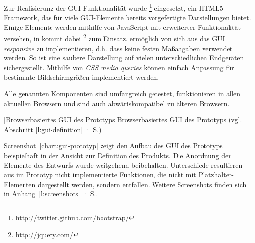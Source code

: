 Zur Realisierung der GUI-Funktionalität wurde \footnote{\url{http://twitter.github.com/bootstrap/}} eingesetzt, ein HTML5-Framework, das für viele GUI-Elemente bereits vorgefertigte Darstellungen bietet. Einige Elemente werden mithilfe von JavaScript mit erweiterter Funktionalität versehen, in  kommt dabei \footnote{\url{http://jquery.com/}} zum Einsatz.  ermöglich von sich aus das GUI \emph{responsive} zu implementieren, d.h. dass keine festen Maßangaben verwendet werden. So ist eine saubere Darstellung auf vielen unterschiedlichen Endgeräten sichergestellt. Mithilfe von \emph{CSS media queries} können einfach Anpassung für bestimmte Bildschirmgrößen implementiert werden.

Alle genannten Komponenten sind umfangreich getestet, funktionieren in allen aktuellen Browsern und sind auch abwärtskompatibel zu älteren Browsern.

\setlength\fboxsep{2pt}
\setlength\fboxrule{0.5pt}

\begin{center}
[Browserbasiertes GUI des Prototyps]{Browserbasiertes GUI des Prototyps (vgl. Abschnitt \ref{l:gui-definition} · S.\pageref{l:gui-definition})}\label{chart:gui-prototyp}
\end{center}

Screenshot~\ref{chart:gui-prototyp} zeigt den Aufbau des GUI des Prototyps beispielhaft in der Ansicht zur Definition des Produkts. Die Anordnung der Elemente des Entwurfs wurde weitgehend beibehalten. Unterschiede resultieren aus im Prototyp nicht implementierte Funktionen, die nicht mit Platzhalter-Elementen dargestellt werden, sondern entfallen. Weitere Screenshots finden sich in Anhang~\ref{l:screenshots} · S.\pageref{l:screenshots}.

